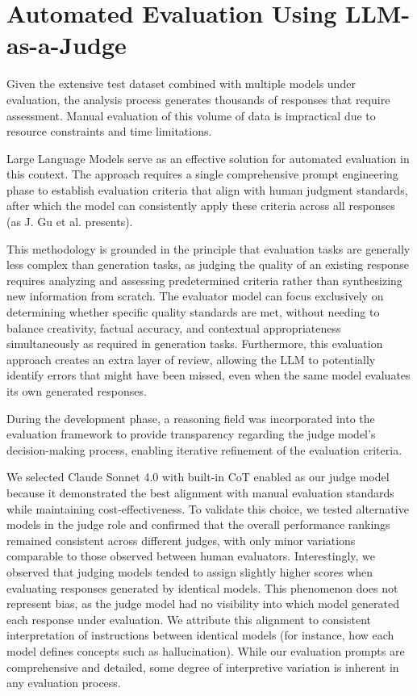 \section{Automated Evaluation Using LLM-as-a-Judge}

Given the extensive test dataset combined with multiple models under evaluation, the analysis process generates thousands of responses that require assessment.
Manual evaluation of this volume of data is impractical due to resource constraints and time limitations.

Large Language Models serve as an effective solution for automated evaluation in this context.
The approach requires a single comprehensive prompt engineering phase to establish evaluation criteria that align with human judgment standards, after which the model can consistently apply these criteria across all responses (as J. Gu et al. \cite{llmasajudge} presents).

This methodology is grounded in the principle that evaluation tasks are generally less complex than generation tasks, as judging the quality of an existing response requires analyzing and assessing predetermined criteria rather than synthesizing new information from scratch.
The evaluator model can focus exclusively on determining whether specific quality standards are met, without needing to balance creativity, factual accuracy, and contextual appropriateness simultaneously as required in generation tasks.
Furthermore, this evaluation approach creates an extra layer of review, allowing the LLM to potentially identify errors that might have been missed, even when the same model evaluates its own generated responses.

During the development phase, a reasoning field was incorporated into the evaluation framework to provide transparency regarding the judge model's decision-making process, enabling iterative refinement of the evaluation criteria.

We selected Claude Sonnet 4.0 with built-in CoT enabled as our judge model because it demonstrated the best alignment with manual evaluation standards while maintaining cost-effectiveness.
To validate this choice, we tested alternative models in the judge role and confirmed that the overall performance rankings remained consistent across different judges, with only minor variations comparable to those observed between human evaluators.
Interestingly, we observed that judging models tended to assign slightly higher scores when evaluating responses generated by identical models. This phenomenon does not represent bias, as the judge model had no visibility into which model generated each response under evaluation.
We attribute this alignment to consistent interpretation of instructions between identical models (for instance, how each model defines concepts such as hallucination).
While our evaluation prompts are comprehensive and detailed, some degree of interpretive variation is inherent in any evaluation process.


